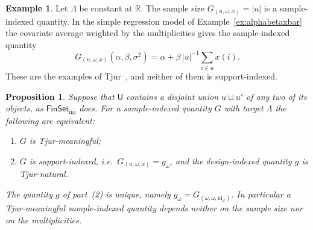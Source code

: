 \documentclass[11pt,a4paper]{article}
\theoremstyle{plain}
\newtheorem{proposition}[theorem]{Proposition}
\theoremstyle{definition}
\newtheorem{example}[theorem]{Example}
\theoremstyle{remark}
\newcommand{\cat}[1]{\mathsf{#1}}
\newcommand{\catU}{\cat{U}}
\newcommand{\FinSet}{\cat{FinSet}}
\newcommand{\id}{\mathrm{id}}
\newcommand{\R}{\mathbb{R}}
\begin{document}
\begin{example}\label{ex:sampleindexed}
Let $\Lambda$ be constant at $\R$. The sample size $G_{(u,\omega,x)} = |u|$ is
a sample-indexed quantity. In the simple regression model of
Example~\ref{ex:alphabetaxbar} the covariate average weighted by the
multiplicities gives the sample-indexed quantity
\[
G_{(u,\omega,x)}(\alpha,\beta,\sigma^{2}) = \alpha + \beta\,|u|^{-1}
\textstyle\sum_{i \in u} x(i).
\]
These are the examples of Tjur~\cite[pp.~1299--1300]{tjur_discussion_2002},
and neither of them is support-indexed.
\end{example}

\begin{proposition}\label{prop:descent}
Suppose that $\catU$ contains a disjoint union $u \sqcup u'$ of any two of its
objects, as $\FinSet_{\mathrm{inj}}$ does. For a sample-indexed quantity $G$
with target $\Lambda$ the following are equivalent:
\begin{enumerate}
\item $G$ is Tjur-meaningful;
\item $G$ is support-indexed, i.e.\ $G_{(u,\omega,x)} = g_{\omega}$, and the
design-indexed quantity $g$ is Tjur-natural.
\end{enumerate}
The quantity $g$ of part~(2) is unique, namely
$g_{\omega} = G_{(\omega,\omega,\id_{\omega})}$. In particular a
Tjur-meaningful sample-indexed quantity depends neither on the sample size nor
on the multiplicities.
\end{proposition}
\end{document}
